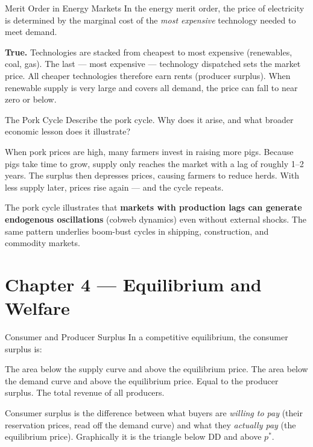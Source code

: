 \documentclass[paper=a5]{scrartcl}
\begin{document}
\begin{question}[type=tf]{Merit Order in Energy Markets}
In the energy merit order, the price of electricity is determined by the
marginal cost of the \emph{most expensive} technology needed to meet demand.
\truefalse[true]
\begin{solution}
  \textbf{True.} Technologies are stacked from cheapest to most expensive
  (renewables, coal, gas). The last — most expensive — technology dispatched
  sets the market price. All cheaper technologies therefore earn rents (producer
  surplus). When renewable supply is very large and covers all demand, the
  price can fall to near zero or below.
\end{solution}
\end{question}

\begin{question}[type=open]{The Pork Cycle}
Describe the pork cycle. Why does it arise, and what broader economic lesson
does it illustrate?

\answerlines[6]

\begin{solution}
  When pork prices are high, many farmers invest in raising more pigs. Because
  pigs take time to grow, supply only reaches the market with a lag of roughly
  1--2 years. The surplus then depresses prices, causing farmers to reduce
  herds. With less supply later, prices rise again — and the cycle repeats.

  The pork cycle illustrates that \textbf{markets with production lags can
  generate endogenous oscillations} (cobweb dynamics) even without external
  shocks. The same pattern underlies boom-bust cycles in shipping, construction,
  and commodity markets.
\end{solution}
\end{question}


\section{Chapter 4 — Equilibrium and Welfare}

\begin{question}[type=mc]{Consumer and Producer Surplus}
In a competitive equilibrium, the consumer surplus is:
\begin{choices}
  \choice        The area below the supply curve and above the equilibrium price.
  \correctchoice The area below the demand curve and above the equilibrium price.
  \choice        Equal to the producer surplus.
  \choice        The total revenue of all producers.
\end{choices}
\begin{solution}
  Consumer surplus is the difference between what buyers are \emph{willing to
  pay} (their reservation prices, read off the demand curve) and what they
  \emph{actually pay} (the equilibrium price). Graphically it is the triangle
  below DD and above $p^*$.
\end{solution}
\end{question}
\end{document}
